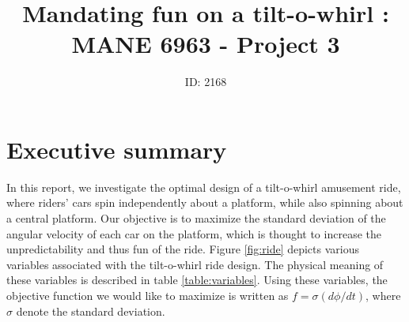 \documentclass[11pt]{article}
\title{Mandating fun on a tilt-o-whirl : MANE 6963 - Project 3}
\author{ID: 2168}
\date{}
\begin{document}
\maketitle

\section{Executive summary}

In this report, we investigate the optimal design of a
tilt-o-whirl amusement ride, where riders' cars spin
independently about a platform, while also spinning
about a central platform. Our objective is to maximize
the standard deviation of the angular velocity of each
car on the platform, which is thought to increase
the unpredictability and thus fun of the ride.
Figure \ref{fig:ride} depicts various variables
associated with the tilt-o-whirl ride design.
The physical meaning of these variables is described
in table \ref{table:variables}. Using these variables,
the objective function we would like to maximize is
written as $f = \sigma(d \phi / d t)$, where $\sigma$
denote the standard deviation.
\end{document}
